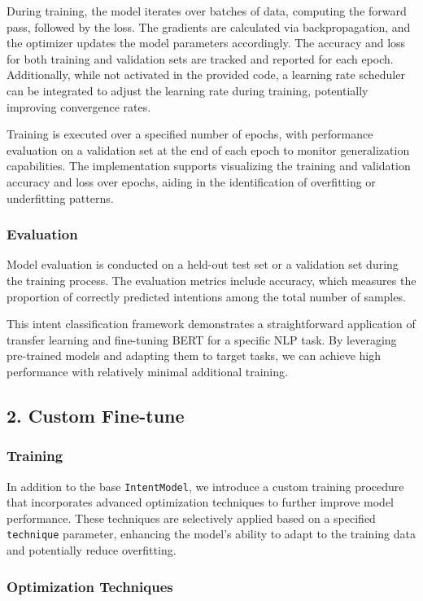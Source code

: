 During training, the model iterates over batches of data, computing the forward pass, followed by the loss. The gradients are calculated via backpropagation, and the optimizer updates the model parameters accordingly. The accuracy and loss for both training and validation sets are tracked and reported for each epoch. Additionally, while not activated in the provided code, a learning rate scheduler can be integrated to adjust the learning rate during training, potentially improving convergence rates.

Training is executed over a specified number of epochs, with performance evaluation on a validation set at the end of each epoch to monitor generalization capabilities. The implementation supports visualizing the training and validation accuracy and loss over epochs, aiding in the identification of overfitting or underfitting patterns.

\subsubsection*{Evaluation}
Model evaluation is conducted on a held-out test set or a validation set during the training process. The evaluation metrics include accuracy, which measures the proportion of correctly predicted intentions among the total number of samples.

This intent classification framework demonstrates a straightforward application of transfer learning and fine-tuning BERT for a specific NLP task. By leveraging pre-trained models and adapting them to target tasks, we can achieve high performance with relatively minimal additional training.


\subsection*{2. Custom Fine-tune}

\subsubsection*{Training}

In addition to the base \texttt{IntentModel}, we introduce a custom training procedure that incorporates advanced optimization techniques to further improve model performance. These techniques are selectively applied based on a specified \texttt{technique} parameter, enhancing the model's ability to adapt to the training data and potentially reduce overfitting.

\subsubsection*{Optimization Techniques}

